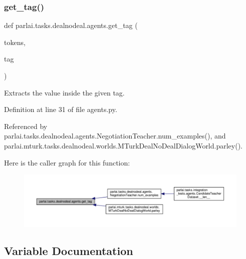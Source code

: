 \subsubsection{\texorpdfstring{get\+\_\+tag()}{get\_tag()}}
{\footnotesize\ttfamily def parlai.\+tasks.\+dealnodeal.\+agents.\+get\+\_\+tag (\begin{DoxyParamCaption}\item[{}]{tokens,  }\item[{}]{tag }\end{DoxyParamCaption})}

\begin{DoxyVerb}Extracts the value inside the given tag.\end{DoxyVerb}
 

Definition at line 31 of file agents.\+py.



Referenced by parlai.\+tasks.\+dealnodeal.\+agents.\+Negotiation\+Teacher.\+num\+\_\+examples(), and parlai.\+mturk.\+tasks.\+dealnodeal.\+worlds.\+M\+Turk\+Deal\+No\+Deal\+Dialog\+World.\+parley().

Here is the caller graph for this function\+:
\nopagebreak
\begin{figure}[H]
\begin{center}
\leavevmode
\includegraphics[width=350pt]{namespaceparlai_1_1tasks_1_1dealnodeal_1_1agents_a7a1e5d8435af234bbf07491e866bb1fd_icgraph}
\end{center}
\end{figure}


\subsection{Variable Documentation}
\mbox{\label{namespaceparlai_1_1tasks_1_1dealnodeal_1_1agents_aec6dc6ffdac8f0d235959647cf3dd95d}} 
